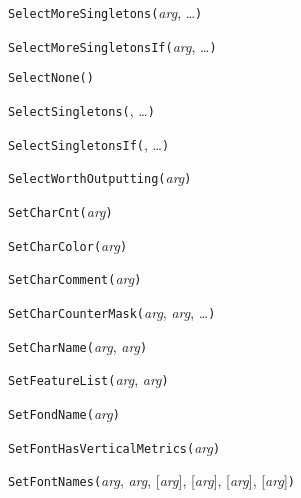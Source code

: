 
\noindent\texttt{SelectMoreSingletons(}\textit{arg}, \ldots\texttt{)}


\noindent\texttt{SelectMoreSingletonsIf(}\textit{arg}, \ldots\texttt{)}


\noindent\texttt{SelectNone(}\texttt{)}


\noindent\texttt{SelectSingletons(}, \ldots\texttt{)}


\noindent\texttt{SelectSingletonsIf(}, \ldots\texttt{)}


\noindent\texttt{SelectWorthOutputting(}\textit{arg}\texttt{)}


\noindent\texttt{SetCharCnt(}\textit{arg}\texttt{)}


\noindent\texttt{SetCharColor(}\textit{arg}\texttt{)}


\noindent\texttt{SetCharComment(}\textit{arg}\texttt{)}


\noindent\texttt{SetCharCounterMask(}\textit{arg}, \textit{arg}, \ldots\texttt{)}


\noindent\texttt{SetCharName(}\textit{arg}, \textit{arg}\texttt{)}


\noindent\texttt{SetFeatureList(}\textit{arg}, \textit{arg}\texttt{)}


\noindent\texttt{SetFondName(}\textit{arg}\texttt{)}


\noindent\texttt{SetFontHasVerticalMetrics(}\textit{arg}\texttt{)}


\noindent\texttt{SetFontNames(}\textit{arg}, \textit{arg}, [\textit{arg}], [\textit{arg}], [\textit{arg}], [\textit{arg}]\texttt{)}


